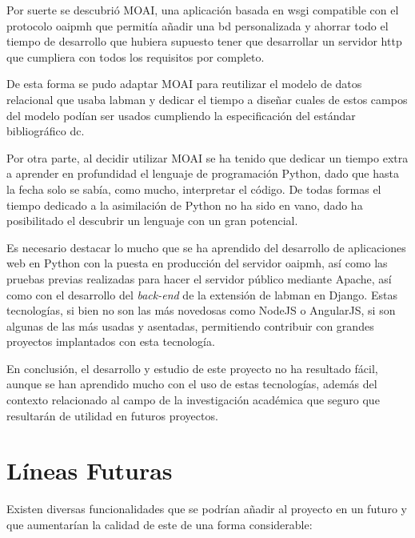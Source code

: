 Por suerte se descubrió MOAI, una aplicación basada en \acrshort{wsgi} compatible con el protocolo \acrshort{oaipmh} que permitía añadir una \acrshort{bd} personalizada y ahorrar todo el tiempo de desarrollo que hubiera supuesto tener que desarrollar un servidor \acrshort{http} que cumpliera con todos los requisitos por completo.

De esta forma se pudo adaptar MOAI para reutilizar el modelo de datos relacional que usaba \acrshort{labman} y dedicar el tiempo a diseñar cuales de estos campos del modelo podían ser usados cumpliendo la especificación del estándar bibliográfico \acrshort{dc}.

Por otra parte, al decidir utilizar MOAI se ha tenido que dedicar un tiempo extra a aprender en profundidad el lenguaje de programación Python, dado que hasta la fecha solo se sabía, como mucho, interpretar el código. De todas formas el tiempo dedicado a la asimilación de Python no ha sido en vano, dado ha posibilitado el descubrir un lenguaje con un gran potencial.

Es necesario destacar lo mucho que se ha aprendido del desarrollo de aplicaciones web en Python con la puesta en producción del servidor \acrshort{oaipmh}, así como las pruebas previas realizadas para hacer el servidor público mediante Apache, así como con el desarrollo del \textit{back-end} de la extensión de \acrshort{labman} en Django. Estas tecnologías, si bien no son las más novedosas como NodeJS\cite{NodeJS} o AngularJS\cite{AngularJS}, si son algunas de las más usadas y asentadas, permitiendo contribuir con grandes proyectos implantados con esta tecnología.

En conclusión, el desarrollo y estudio de este proyecto no ha resultado fácil, aunque se han aprendido mucho con el uso de estas tecnologías, además del contexto relacionado al campo de la investigación académica que seguro que resultarán de utilidad en futuros proyectos.

\section{Líneas Futuras}\label{sec:future_lines}

Existen diversas funcionalidades que se podrían añadir al proyecto en un futuro y que aumentarían la calidad de este de una forma considerable:

